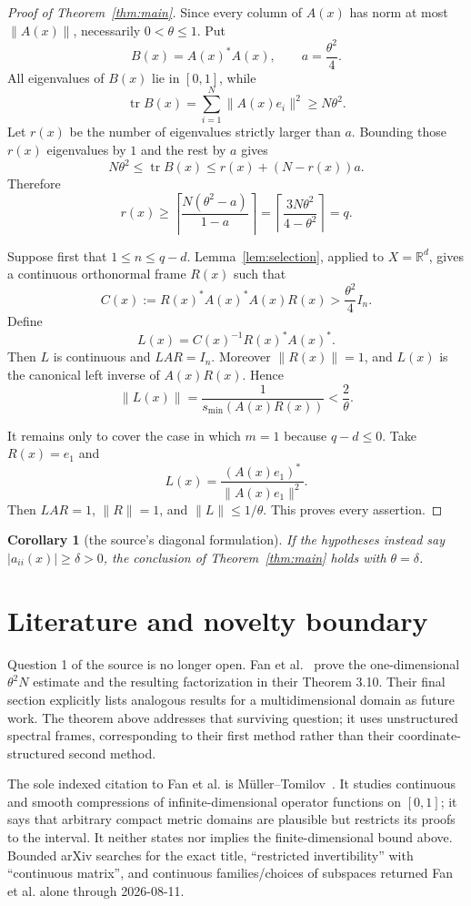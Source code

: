 \documentclass[11pt]{article}
\newtheorem{corollary}[theorem]{Corollary}
\newcommand{\R}{\mathbb R}
\newcommand{\tr}{\operatorname{tr}}
\begin{document}
\begin{proof}[Proof of Theorem~\ref{thm:main}]
Since every column of $A(x)$ has norm at most $\|A(x)\|$, necessarily
$0<\theta\leq1$.  Put
\[
 B(x)=A(x)^*A(x),\qquad a=\frac{\theta^2}{4}.
\]
All eigenvalues of $B(x)$ lie in $[0,1]$, while
\[
 \tr B(x)=\sum_{i=1}^N\|A(x)e_i\|^2\geq N\theta^2.
\]
Let $r(x)$ be the number of eigenvalues strictly larger than $a$.  Bounding
those $r(x)$ eigenvalues by $1$ and the rest by $a$ gives
\[
 N\theta^2\leq\tr B(x)
 \leq r(x)+(N-r(x))a.
\]
Therefore
\[
 r(x)\geq
 \left\lceil\frac{N(\theta^2-a)}{1-a}\right\rceil
 =\left\lceil\frac{3N\theta^2}{4-\theta^2}\right\rceil=q.
\]

Suppose first that $1\leq n\leq q-d$.  Lemma~\ref{lem:selection}, applied
to $X=\R^d$, gives a continuous orthonormal frame $R(x)$ such that
\[
 C(x):=R(x)^*A(x)^*A(x)R(x)>\frac{\theta^2}{4}I_n.
\]
Define
\[
 L(x)=C(x)^{-1}R(x)^*A(x)^*.
\]
Then $L$ is continuous and $LAR=I_n$.  Moreover $\|R(x)\|=1$, and $L(x)$
is the canonical left inverse of $A(x)R(x)$.  Hence
\[
 \|L(x)\|=\frac1{s_{\min}(A(x)R(x))}<\frac2\theta.
\]

It remains only to cover the case in which $m=1$ because $q-d\leq0$.
Take $R(x)=e_1$ and
\[
 L(x)=\frac{(A(x)e_1)^*}{\|A(x)e_1\|^2}.
\]
Then $LAR=1$, $\|R\|=1$, and $\|L\|\leq1/\theta$.  This proves every
assertion.
\end{proof}

\begin{corollary}[the source's diagonal formulation]
If the hypotheses instead say $|a_{ii}(x)|\geq\delta>0$, the conclusion of
Theorem~\ref{thm:main} holds with $\theta=\delta$.
\end{corollary}

\section{Literature and novelty boundary}

Question 1 of the source is no longer open.  Fan et al.~\cite{FanEtAl} prove
the one-dimensional $\theta^2N$ estimate and the resulting factorization in
their Theorem 3.10.  Their final section explicitly lists analogous results
for a multidimensional domain as future work.  The theorem above addresses
that surviving question; it uses unstructured spectral frames, corresponding
to their first method rather than their coordinate-structured second method.

The sole indexed citation to Fan et al. is Müller--Tomilov~\cite{MT}.  It
studies continuous and smooth compressions of infinite-dimensional operator
functions on $[0,1]$; it says that arbitrary compact metric domains are
plausible but restricts its proofs to the interval.  It neither states nor
implies the finite-dimensional bound above.  Bounded arXiv searches for the
exact title, ``restricted invertibility'' with ``continuous matrix'', and
continuous families/choices of subspaces returned Fan et al. alone through
2026-08-11.
\end{document}

